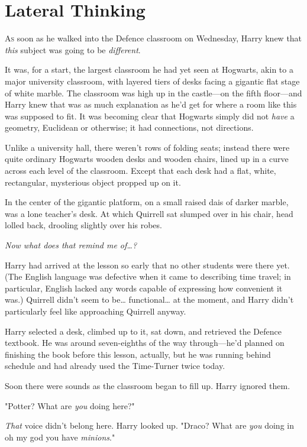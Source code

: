 \chapter{Lateral Thinking}

\lettrine{A}{s} soon as he walked into the Defence classroom on Wednesday, Harry knew that 
\emph{this} subject was going to be \emph{different}.

It was, for a start, the largest classroom he had yet seen at Hogwarts, akin to 
a major university classroom, with layered tiers of desks facing a gigantic 
flat stage of white marble. The classroom was high up in the castle---on the 
fifth floor---and Harry knew that was as much explanation as he'd get for where 
a room like this was supposed to fit. It was becoming clear that Hogwarts 
simply did not \emph{have} a geometry, Euclidean or otherwise; it had 
connections, not directions.

Unlike a university hall, there weren't rows of folding seats; instead there 
were quite ordinary Hogwarts wooden desks and wooden chairs, lined up in a 
curve across each level of the classroom. Except that each desk had a flat, 
white, rectangular, mysterious object propped up on it.

In the center of the gigantic platform, on a small raised dais of darker 
marble, was a lone teacher's desk. At which Quirrell sat slumped over in his 
chair, head lolled back, drooling slightly over his robes.

\emph{Now what does that remind me of{\ldots}?}

Harry had arrived at the lesson so early that no other students were there yet. 
(The English language was defective when it came to describing time travel; in 
particular, English lacked any words capable of expressing how convenient it 
was.) Quirrell didn't seem to be{\ldots} functional{\ldots} at the moment, and 
Harry didn't particularly feel like approaching Quirrell anyway.

Harry selected a desk, climbed up to it, sat down, and retrieved the Defence 
textbook. He was around seven-eighths of the way through---he'd planned on 
finishing the book before this lesson, actually, but he was running behind 
schedule and had already used the Time-Turner twice today.

Soon there were sounds as the classroom began to fill up. Harry ignored them.

"Potter? What are \emph{you} doing here?"

\emph{That} voice didn't belong here. Harry looked up. "Draco? What are 
\emph{you} doing in oh my god you have \emph{minions}."

